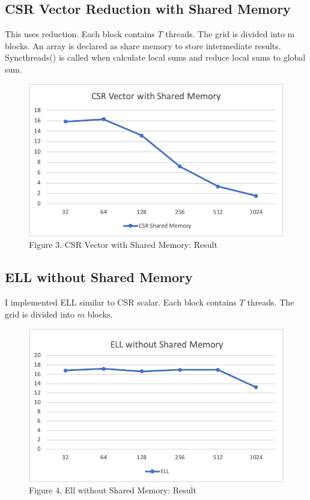 \documentclass[a4paper,11pt,BCOR10mm,oneside,headsepline]{scrartcl}
\begin{document}
		\newpage
		\subsection{CSR Vector Reduction with Shared Memory}
		This uses reduction. Each block contains \(T\) threads. The grid is divided into m blocks. An array is declared as share memory to store intermediate results. Syncthreads() is called when calculate local sums and reduce local sums to global sum.
		
		\begin{figure}[!htbp]
			\centering
			\includegraphics[scale=0.6]{./figures/csr_shared_result}
			\caption*{Figure 3. CSR Vector with Shared Memory: Result}
		\end{figure}
		
		\subsection{ELL without Shared Memory}
		I implemented ELL similar to CSR scalar. Each block contains \(T\) threads. The grid is divided into \(m\) blocks.
		
		\begin{figure}[!htbp]
			\centering
			\includegraphics[scale=0.5]{./figures/ell_result}
			\caption*{Figure 4. Ell without Shared Memory: Result}
		\end{figure}
	
\end{document}
